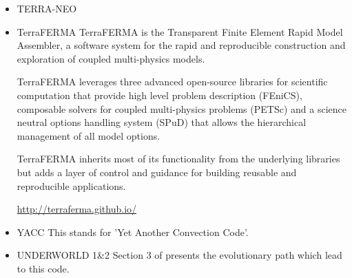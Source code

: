 \begin{itemize}
{\small
\noindent
\cite{baum83}
\cite{buri96}
\cite{glat88}
\cite{tasg93}
\cite{tasg94}
\cite{buba95}
\cite{burb97}\cite{yang97}
\cite{burl98}
\cite{tabg99}
\cite{buda01}
\cite{burb02}
\cite{dabu06}
\cite{phbs09}\cite{wodd09}\cite{gows09}
\cite{yayh10}
\cite{woda11}\cite{iahb11}
\cite{dagd12}\cite{shbs12}
\cite{dadb13}
\cite{vade16}
\cite{woda17}
\cite{ghbu18}
}

\item {\codefont TERRA-NEO} 

\cite{wegg15}


\item {\codefont TerraFERMA} 
TerraFERMA is the Transparent Finite Element Rapid Model Assembler, a software system for the rapid and reproducible construction and exploration of coupled multi-physics models.

TerraFERMA leverages three advanced open-source libraries for scientific computation that provide high level problem description (FEniCS), composable solvers for coupled multi-physics problems (PETSc) and a science neutral options handling system (SPuD) that allows the hierarchical management of all model options.

TerraFERMA inherits most of its functionality from the underlying libraries but adds a layer of control and guidance for building reusable and reproducible applications.

\url{http://terraferma.github.io/}

{\small
\noindent
\cite{wisv14}
\cite{wisv17}
\cite{spmw16}
\cite{ceww17}
\cite{ceww19}
}

\item {\codefont YACC} 
This stands for 'Yet Another Convection Code'.

{\small
\noindent
\cite{sato12}
\cite{toyd13}
\cite{tosn15}
\cite{tomy16}
}

\item {\codefont UNDERWORLD 1\&2} 
Section 3 of \cite{qums07} presents the evolutionary path which lead to this code.


\end{itemize}
